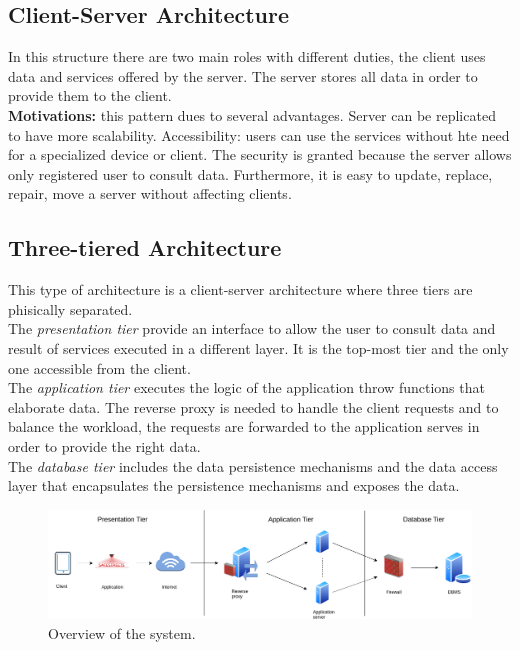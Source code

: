 \documentclass{report}
\begin{document}
\subsection{Client-Server Architecture}
In this structure there are two main roles with different duties, the client uses data and services offered by the server.
The server stores all data in order to provide them to the client.\\
\textbf{Motivations:} this pattern dues to several advantages. Server can be replicated to have more scalability. 
Accessibility: users can use the services without hte need for a specialized device or client.
The security is granted because the server allows only registered user to consult data.
Furthermore, it is easy to update, replace, repair, move a server without affecting clients.
\subsection{Three-tiered Architecture}
This type of architecture is a client-server architecture where three tiers are phisically separated.\\
The \textit{presentation tier} provide an interface to allow the user to consult data and result of services executed in a different layer. 
It is the top-most tier and the only one accessible from the client.\\
The \textit{application tier} executes the logic of the application throw functions that elaborate data. 
The reverse proxy is needed to handle the client requests and to balance the workload, the requests are forwarded to 
the application serves in order to provide the right data.\\
The \textit{database tier} includes the data persistence mechanisms and the data access layer that encapsulates 
the persistence mechanisms and exposes the data.
\begin{figure}[!ht]
	\begin{center}
	\includegraphics[width=\textwidth]{img/TiersArchitecture.png}
	\end{center}
	\caption{Overview of the system.}
\end{figure}
\end{document}
